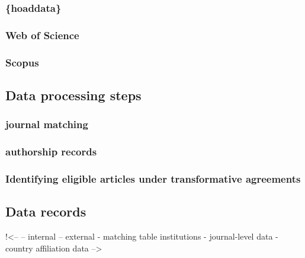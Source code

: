 \documentclass[a4paper,man,floatsintext,longtable,noextraspace,12pt]{apa6}
\begin{document}
\subsubsection{\{hoaddata\}}\label{hoaddata}

\subsubsection{Web of Science}\label{web-of-science}

\subsubsection{Scopus}\label{scopus}

\subsection{Data processing steps}\label{data-processing-steps}

\subsubsection{journal matching}\label{journal-matching}

\subsubsection{authorship records}\label{authorship-records}

\subsubsection{Identifying eligible articles under transformative
agreements}\label{identifying-eligible-articles-under-transformative-agreements}

\subsection{Data records}\label{data-records}

!\textless-- -- internal -- external - matching table institutions -
journal-level data - country affiliation data --\textgreater{}
\end{document}
